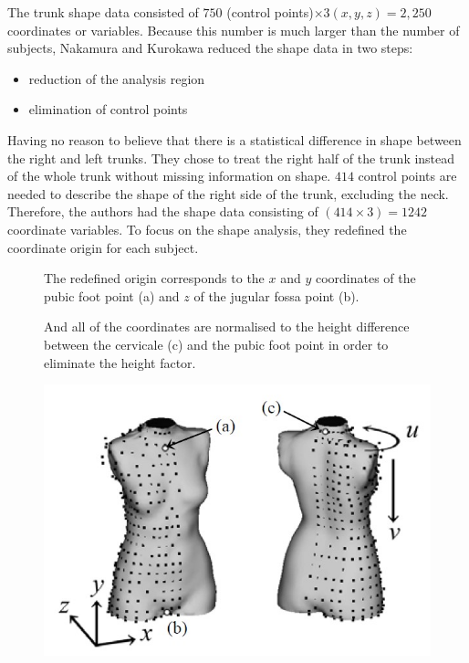 \documentclass[12pt,a4paper,openany,UKenglish]{scrreprt}
\begin{document}
The trunk shape data consisted of $750$ (control points)$\times 3(x, y, z) = 2,250$ coordinates or variables.
Because this number is much larger than the number of subjects, Nakamura and Kurokawa reduced the shape data in two steps:
\begin{itemize}
	\setlength\itemsep{-0.25em}
	\item reduction of the analysis region
	\item elimination of control points
\end{itemize}
Having no reason to believe that there is a statistical difference in shape between the right and left trunks.
They chose to treat the right half of the trunk instead of the whole trunk without missing information on shape.
$414$ control points are needed to describe the shape of the right side of the trunk, excluding the neck.
Therefore, the authors had the shape data consisting of $(414 \times 3) = 1242$ coordinate variables.
To focus on the shape analysis, they redefined the coordinate origin for each subject.
\begin{figure}[H]
	\begin{minipage}{0.22\textwidth}
		The redefined origin corresponds to the $x$ and $y$ coordinates of the pubic foot point (a) and $z$ of the jugular fossa point (b).

		And all of the coordinates are normalised to the height difference between the cervicale (c) and the pubic foot point in order to eliminate the height factor.
	\end{minipage}\hfill
	\begin{minipage}{0.78\textwidth}
		\centering
		\includegraphics[width=0.75\linewidth]{../Images/Kuro1.jpg}
	\end{minipage}
\end{figure}
\end{document}
